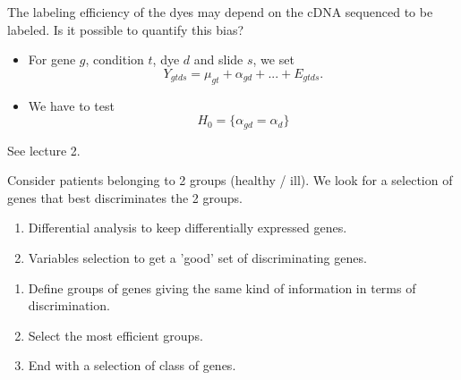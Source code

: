 \documentclass[dvips, lscape]{foils}
\newcommand{\textblue}[1]{\textcolor{blue}{#1}}
\newcommand{\subsection}[1]{\noindent{\large \textblue{#1}}}
\newcommand{\paragraph}[1]{\noindent {\textblue{#1}}}
\begin{document}
The labeling efficiency of the dyes may depend on the cDNA sequenced
to be labeled. Is it possible to quantify this bias?
\begin{itemize}
\item For gene $g$, condition $t$, dye $d$ and slide $s$, we set
  $$
  Y_{gtds} = \mu_{gt} + \alpha_{gd} + ... + E_{gtds}.
  $$
\item We have to test
  $$
  H_0 = \{\alpha_{gd} = \alpha_d\}
  $$
\end{itemize}

\bigskip\bigskip
\subsection{Multiple testing: local FDR estimation ,estimation of
  $\pi_0$}

See lecture 2.

\newpage
\subsection{Gene selection / agregation for supervised classification}

Consider patients belonging to 2 groups (healthy / ill). We look for
a selection of genes that best discriminates the 2 groups.

\bigskip\bigskip
\paragraph{Standard strategies.} 
\begin{enumerate}
\item Differential analysis to keep differentially expressed genes.
\item Variables selection to get a 'good' set of discriminating genes.
\end{enumerate}

\bigskip\bigskip
\paragraph{Compression selection}
\begin{enumerate}
\item Define groups of genes giving the same kind of information in
  terms of discrimination.
\item Select the most efficient groups.
\item End with a selection of class of genes.
\end{enumerate}
\end{document}
